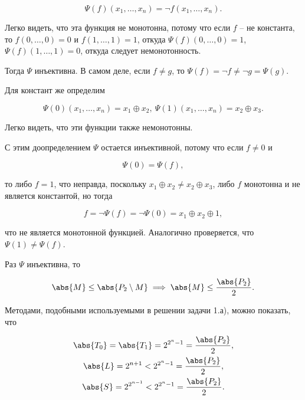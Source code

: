 		\begin{equation*}
			\Psi(f)(x_1, \dots, x_n) = \neg f(x_1, \dots, x_n).
		\end{equation*}

		Легко видеть, что эта функция не монотонна, потому что если $f$ -- не константа, то $f(0, \dots, 0) = 0$ и $f(1, \dots, 1) = 1$, откуда $\Psi(f)(0, \dots, 0) = 1$, $\Psi(f)(1, \dots, 1) = 0$, откуда следует немонотонность.

		Тогда $\Psi$ инъективна. В самом деле, если $f \ne g$, то $\Psi(f) = \neg f \ne \neg g = \Psi(g)$.

		Для констант же определим

		\begin{equation*}
			\Psi(0)(x_1, \dots, x_n) = x_1 \oplus x_2, \ \Psi(1)(x_1, \dots, x_n) = x_2 \oplus x_3.
		\end{equation*}

		Легко видеть, что эти функции также немонотонны.

		С этим доопределением $\Psi$ остается инъективной, потому что если $f \ne 0$ и

		\begin{equation*}
			\Psi(0) = \Psi(f),
		\end{equation*}

		то либо $f = 1$, что неправда, поскольку $x_1 \oplus x_2 \ne x_2 \oplus x_3$, либо $f$ монотонна и не является константой, но тогда

		\begin{equation*}
			f = \neg \Psi(f) = \neg \Psi(0) = x_1 \oplus x_2 \oplus 1,
		\end{equation*}

		что не является монотонной функцией. Аналогично проверяется, что $\Psi(1) \ne \Psi(f)$.

		Раз $\Psi$ инъективна, то

		\begin{equation*}
			\abs{M} \le \abs{P_2 \setminus M} \implies \abs{M} \le \frac{\abs{P_2}}{2}.
		\end{equation*}

		Методами, подобными используемыми в решении задачи 1.а), можно показать, что

		\begin{gather*}
			\abs{T_0} = \abs{T_1} = 2^{2^n-1} = \frac{\abs{P_2}}{2}, \\
			\abs{L} = 2^{n+1} < 2^{2^n-1} = \frac{\abs{P_2}}{2}, \\
			\abs{S} = 2^{2^{n-1}} < 2^{2^n-1} = \frac{\abs{P_2}}{2}.
		\end{gather*}

